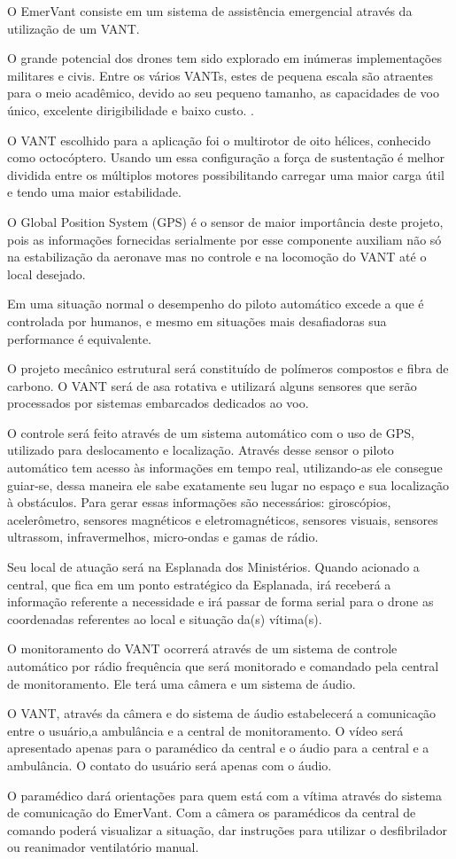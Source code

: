 O EmerVant consiste em um sistema de assistência emergencial através da utilização de um VANT.	

O grande potencial dos drones tem sido explorado em inúmeras implementações militares e civis. Entre os vários VANTs, estes de pequena escala são atraentes para o meio acadêmico, devido ao seu pequeno tamanho, as capacidades de voo único, excelente dirigibilidade e baixo custo. \cite{SDM}.

O VANT escolhido para a aplicação foi o multirotor de oito hélices, conhecido como octocóptero. Usando um essa configuração a força de sustentação é melhor dividida entre os múltiplos motores possibilitando carregar uma maior carga útil e tendo uma maior estabilidade.

O Global Position System (GPS) é o sensor de maior importância deste projeto, pois as informações fornecidas serialmente por esse componente auxiliam não só na estabilização da aeronave mas no controle e na locomoção do VANT até o local desejado.

Em uma situação normal o desempenho do piloto automático excede a que é controlada por humanos, e mesmo em situações mais desafiadoras sua performance é equivalente.

O projeto mecânico estrutural será constituído de polímeros compostos e fibra de carbono. O VANT será de asa rotativa e utilizará alguns sensores que serão processados por sistemas embarcados dedicados ao voo. 

O controle será feito através de um sistema automático com o uso de GPS, utilizado para deslocamento e localização. Através desse sensor o piloto automático tem acesso às informações em tempo real, utilizando-as ele consegue guiar-se, dessa maneira ele sabe exatamente seu lugar no espaço e sua localização à obstáculos. Para gerar essas informações são necessários: giroscópios, acelerômetro, sensores magnéticos e eletromagnéticos, sensores visuais, sensores ultrassom, infravermelhos, micro-ondas e gamas de rádio. \cite{UDE}

Seu local de atuação será na Esplanada dos Ministérios. Quando acionado a central, que fica em um ponto estratégico da Esplanada, irá receberá a informação referente a necessidade e irá passar de forma serial para o drone as coordenadas referentes  ao local e situação da(s) vítima(s).

O monitoramento do VANT ocorrerá através de um sistema de controle automático por rádio frequência que será monitorado e comandado pela central de monitoramento. Ele terá uma câmera e um sistema de áudio.

O VANT, através da câmera e do sistema de áudio estabelecerá a comunicação entre o usuário,a ambulância e a central de monitoramento. O vídeo será apresentado apenas para o paramédico da central e o áudio para a central e a ambulância. O contato do usuário será apenas com o áudio.

O paramédico dará orientações para quem está com a vítima através do sistema de comunicação do EmerVant. Com a câmera os paramédicos da central de comando poderá visualizar a situação, dar instruções para utilizar o desfibrilador ou reanimador ventilatório manual. 
